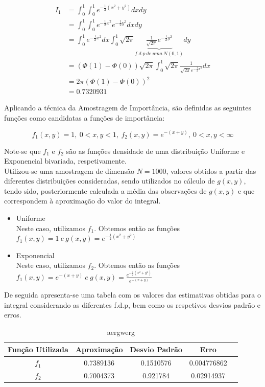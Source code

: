 \documentclass[letterpaper,11pt]{article}
\begin{document}
\begin{align*}
I_1 & = \int_{0}^{1} \int_{0}^{1}e^{-\frac{1}{2}(x^2+y^2)} dxdy\\
& = \int_{0}^{1} \int_{0}^{1}e^{-\frac{1}{2}x^2} e^{-\frac{1}{2}y^2} dxdy\\
& = \int_{0}^{1}e^{-\frac{1}{2}x^2} dx \int_{0}^{1} \sqrt{2 \pi} \underbrace{ \frac{1}{\sqrt{2\pi}} e^{-\frac{1}{2}y^2}}_{f.d.p \ de \ uma \ N(0,1)} dy\\
& = (\Phi (1) - \Phi(0)) \sqrt{2\pi} \int_{0}^{1} \sqrt{2 \pi} \frac{1}{\sqrt{2\pi} e^{-\frac{1}{2}x^2}} dx\\
& = 2\pi(\Phi(1) - \Phi(0))^2\\
& = 0.7320931
\end{align*}

Aplicando a técnica da Amostragem de Importância, são definidas as seguintes funções como candidatas a funções de importância: 

\begin{equation} 
f_1(x,y) = 1,\ 0 < x,y <1, \ f_2(x,y) = e^{-(x+y)}, \ 0<x,y< \infty
\end{equation}

Note-se que $f_1$ e $f_2$ são as funções densidade de uma distribuição Uniforme e Exponencial bivariada, respetivamente.\\
Utilizou-se uma amostragem de dimensão $N=1000$, valores obtidos a partir das diferentes distribuições consideradas, sendo utilizados no cálculo de $g(x,y)$, tendo sido, posteriormente calculada a média das observações de $g(x,y)$ e que correspondem à aproximação do valor do integral. 
\begin{itemize}
\item Uniforme\\
Neste caso, utilizamos $f_1$. Obtemos então as funções $f_1(x,y)=1\ e \ g(x,y) =e^{-\frac{1}{2}(x^2+y^2)} $
\item Exponencial \\
Neste caso, utilizamos $f_2$. Obtemos então as funções $f_1(x,y)=e^{-(x+y)}\ e \ g(x,y) =\frac{e^{-\frac{1}{2}(x^2+y^2)}}{e^{-(x+y)}} $
\end{itemize}
De seguida apresenta-se uma tabela com os valores das estimativas obtidas para o integral considerando as diferentes f.d.p, bem como os respetivos desvios padrão e erros.

\begin{table}[H]
\begin{center}
\begin{tabular}{|c|c| c| c| c||}
\hline
Função Utilizada & Aproximação & Desvio Padrão & Erro \\
\hline
$f_1$ & 0.7389136 & 0.1510576 & 0.004776862 \\
\hline
$f_2$ & 0.7004373 & 0.921784 & 0.02914937 \\
\hline
\end{tabular}
\caption{aergwerg}
\end{center}
\end{table}
\end{document}
